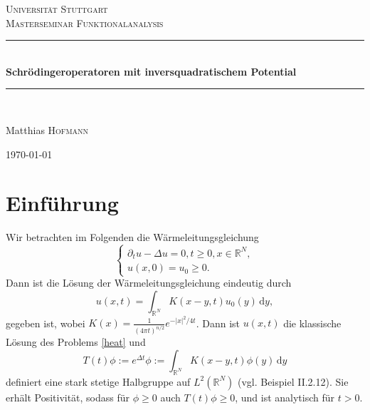 \documentclass[11pt,twoside,a4paper]{article}
\theoremstyle{break}
\begin{document}
\cleardoublepage
\begin{titlepage}

\begin{center}



\textsc{\LARGE Universit\"at Stuttgart}\\[1.5cm]

\textsc{\Large Masterseminar Funktionalanalysis}\\[0.5cm]


\newcommand{\HRule}{\rule{\linewidth}{0.5mm}}
\HRule \\[0.4cm]
{ \huge \bfseries Schr\"odingeroperatoren mit inversquadratischem Potential}\\[0.4cm]

\HRule \\[1.5cm]


\begin{center} \Large
Matthias \textsc{Hofmann}
\end{center}

\hfill

\vfill

{\large \today}

\end{center}

\end{titlepage}

\thispagestyle{empty}
\mbox{}\newpage
\addtocounter{page}{-2}
\section{Einf\"uhrung}
Wir betrachten im Folgenden die W\"armeleitungsgleichung
\begin{equation}\label{heat}
\begin{cases}
\partial_t u - \Delta u =0, t\ge 0, x\in \mathbb R^N,\\
u(x,0)=u_0 \ge 0.
\end{cases}
\end{equation}
Dann ist die L\"osung der W\"armeleitungsgleichung eindeutig durch
\begin{equation}
u(x,t)=\int_{\mathbb R^N} K(x-y, t) u_0(y) \, \mathrm dy,
\end{equation}
gegeben ist, wobei $K(x)=\frac{1}{(4\pi t)^{n/2}} e^{-|x|^2/4t}$. Dann ist $u(x,t)$ die klassische L\"osung des Problems \eqref{heat} 
und
\begin{equation}
T(t)\phi:=e^{\Delta t}\phi:=\int_{\mathbb R^N} K(x-y,t) \phi(y)\, \mathrm dy 
\end{equation}
definiert eine stark stetige Halbgruppe auf $L^2(\mathbb R^N)$ (vgl. \cite{engel-nagel} Beispiel II.2.12). Sie erh\"alt Positivit\"at, sodass f\"ur $\phi \ge 0$ auch $T(t) \phi \ge 0$, und ist analytisch f\"ur $t>0$.
\end{document}
